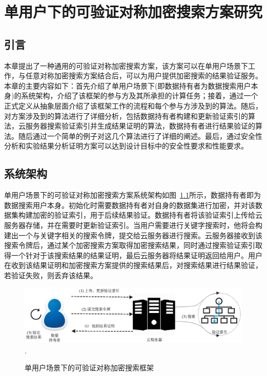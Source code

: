 \chapter{单用户下的可验证对称加密搜索方案研究}
\label{cha:single-user}
\section{引言}
本章提出了一种通用的可验证对称加密搜索方案\single，该方案可以在单用户场景下工作，与任意对称加密搜索方案结合后，可以为用户提供加密搜索的结果验证服务。本章的主要内容如下：首先介绍了单用户场景下(即数据持有者为数据搜索用户本身)的系统架构，介绍了该框架的参与方及其所承担的计算任务；接着，通过一个正式定义从抽象层面介绍了该框架工作的流程和每个参与方涉及到的算法。随后，对\single 方案涉及到的算法进行了详细分析，包括数据持有者构建和更新验证索引的算法，云服务器搜索验证索引并生成结果证明的算法，数据持有者进行结果验证的算法。随后通过一个简单的例子对这几个算法进行了详细的阐述。最后，通过安全性分析和实验结果分析证明\single 方案可以达到设计目标中的安全性要求和性能要求。

\section{系统架构}
单用户场景下的可验证对称加密搜索方案系统架构如图~\ref{fig:GS-VSSE}所示，数据持有者即为数据搜索用户本身。初始化时需要数据持有者对自身的数据集进行加密，并对该数据集构建加密的验证索引，用于后续结果验证。数据持有者将该验证索引上传给云服务器存储，并在需要时更新验证索引。当用户需要进行关键字搜索时，他将会构建出一个与关键字相关的搜索令牌，提交给云服务器进行搜索。云服务器接收到该搜索令牌后，通过某个加密搜索方案取得加密搜索结果，同时通过搜索验证索引取得一个针对于该搜索结果的结果证明，最后云服务器将结果证明返回给用户。用户在收到该结果证明和加密搜索方案提供的搜索结果后，对搜索结果进行结果验证，若验证失败，则丢弃该结果。
\begin{figure}[t]
\centering
\includegraphics[width=6 in]{fig/GS-VSSE}
\DeclareGraphicsExtensions.
\caption{单用户场景下的可验证对称加密搜索框架\single}
\label{fig:GS-VSSE}
\end{figure}



